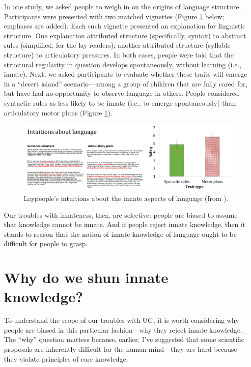 \documentclass[output=paper,colorlinks,citecolor=brown
]{langscibook}
\begin{document}
In one study, we asked people to weigh in on the origins of language structure \citep{berent2019people}. Participants were presented with two matched vignettes (Figure \ref{fig:figure1} below; emphases are added). Each such vignette presented an explanation for linguistic structure. One explanation attributed structure (specifically, syntax) to abstract rules (simplified, for the lay readers); another attributed structure (syllable structure) to articulatory pressures.  In both cases, people were told that the structural regularity in question develops spontaneously, without learning (i.e., innate). Next, we asked participants to evaluate whether these traits will emerge in a “desert island” scenario—among a group of children that are fully cared for, but have had no opportunity to observe language in others. People considered syntactic rules as less likely to be innate (i.e., to emerge spontaneously) than articulatory motor plans (Figure \ref{fig:figure1}). 

\begin{figure}
    \centering
    \includegraphics[width=\textwidth,keepaspectratio]{figures/berent_figure1.jpg}
    \caption{Laypeople’s intuitions about the innate aspects of language (from \cite{berent2019people}).}
    \label{fig:figure1}
\end{figure}

Our troubles with innateness, then, are selective: people are biased to assume that knowledge cannot be innate. And if people reject innate knowledge, then it stands to reason that the notion of innate knowledge of language ought to be difficult for people to grasp.

\section{Why do we shun innate knowledge?}

To understand the scope of our troubles with UG, it is worth considering why people are biased in this particular fashion—why they reject innate knowledge. The “why” question matters because, earlier, I’ve suggested that some scientific proposals are inherently difficult for the human mind—they are hard because they violate principles of core knowledge.
\end{document}

